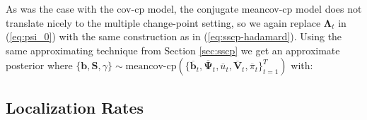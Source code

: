 As was the case with the cov-cp model, the conjugate meancov-cp model does not translate nicely to the multiple change-point setting, so we again replace $\boldsymbol{\Lambda}_t$ in (\ref{eq:psi_0}) with the same construction as in (\ref{eq:sscp-hadamard}). Using the same approximating technique from Section \ref{sec:sscp} we get an approximate posterior where $\{\mathbf{b}, \mathbf{S}, \gamma\}\sim\text{meancov-cp}(\{\overline{\mathbf{b}}_t, \overline{\boldsymbol{\Psi}}_t, \overline{u}_t, \overline{\mathbf{V}}_t, \overline{\pi}_t\}_{t=1}^T)$ with:



\subsection{Localization Rates}
\label{sec:localization}


